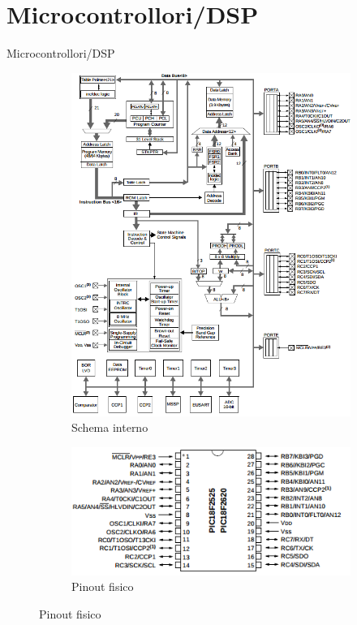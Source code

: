 \documentclass{beamer}
\begin{document}
\section{Microcontrollori/DSP}
\begin{frame}{Microcontrollori/DSP}
\begin{figure}
\centering
\begin{subfigure}{.5\textwidth}
  \centering
  \includegraphics[scale=0.35]{images/pic18f4620.png}
  \caption{Schema interno}
\end{subfigure}%
\begin{subfigure}{.5\textwidth}
  \centering
  \includegraphics[scale=0.4]{images/pic18f4620_pinout.png}
  \caption{Pinout fisico}
\end{subfigure}
\end{figure}
\end{frame}
\end{document}
